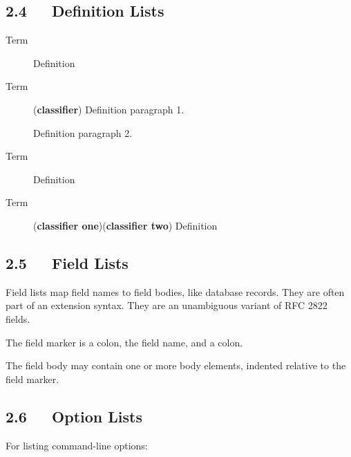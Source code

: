 \documentclass[a4paper]{article}
\begin{document}
\subsection{2.4   Definition Lists%
  \label{definition-lists}%
}

\begin{description}
\item[{Term}] 
Definition

\item[{Term}] (\textbf{classifier})
Definition paragraph 1.

Definition paragraph 2.

\item[{Term}] 
Definition

\item[{Term}] (\textbf{classifier one})(\textbf{classifier two})
Definition
\end{description}


\subsection{2.5   Field Lists%
  \label{field-lists}%
}

\begin{DUfieldlist}
\item[{what:}]
Field lists map field names to field bodies, like database
records.  They are often part of an extension syntax.  They are
an unambiguous variant of RFC 2822 fields.

\item[{how arg1 arg2:}]
The field marker is a colon, the field name, and a colon.

The field body may contain one or more body elements, indented
relative to the field marker.

\item[{credits:}]
\end{DUfieldlist}


\subsection{2.6   Option Lists%
  \label{option-lists}%
}

For listing command-line options:
\end{document}
